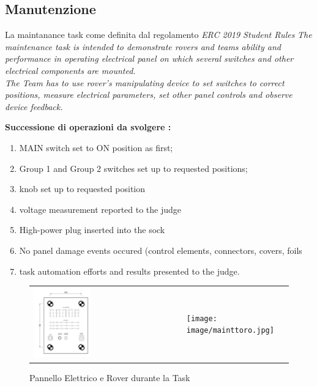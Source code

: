 \documentclass[%
corpo=11pt,
twoside,
 stile=classica,
oldstyle,
greek,%
]{toptesi}
\begin{document}
		\subsection{Manutenzione}
		La  maintanance task come definita dal regolamento 
		\textit{ERC 2019 Student Rules} \cite{ERC2019} 
		\newline
		\textit{The maintenance task is intended to demonstrate rovers and teams ability and performance in operating electrical panel on which several switches and other electrical components are mounted. \\
		The Team has to use rover’s manipulating device to set switches to correct positions, measure electrical parameters, set other panel controls and observe device feedback.}

		\newline
		\textbf{Successione di operazioni da svolgere :}
		\begin{enumerate}
		\item MAIN switch set to ON position as first;
		\item Group 1 and Group 2 switches set up to requested positions;
		\item knob set up to requested position
		\item voltage measurement reported to the judge
		\item High-power plug inserted into the sock
		\item No panel damage events occured (control elements, connectors, covers, foils
		\item task automation efforts and results presented to the judge.	 
		\end{enumerate}
	
		\begin{figure}
		\centering
		\begin{tabular}{ll}
		\includegraphics[width=0.4\textwidth]{image/panel.png}
		&
		\texttt{[image: image/mainttoro.jpg]}
		\end{tabular}
		\caption{Pannello Elettrico e Rover durante la Task}
		\label{fig:maintanance}
		\end{figure}
	
\end{document}
